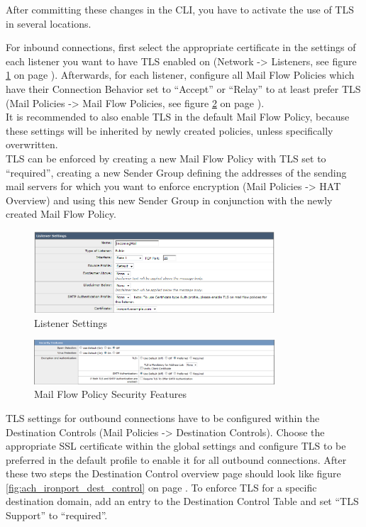 After committing these changes in the CLI, you have to activate the use of TLS in several locations.

For inbound connections, first select the appropriate certificate in the settings of each listener you want to have TLS enabled on (Network -> Listeners, see figure \ref{fig:ach_ironport_listener_cert} on page \pageref{fig:ach_ironport_listener_cert}). Afterwards, for each listener, configure all Mail Flow Policies which have their Connection Behavior set to ``Accept'' or ``Relay'' to at least prefer TLS (Mail Policies -> Mail Flow Policies, see figure \ref{fig:ach_ironport_mail_flow_tls} on page \pageref{fig:ach_ironport_mail_flow_tls}). \\
It is recommended to also enable TLS in the default Mail Flow Policy, because these settings will be inherited by newly created policies, unless specifically overwritten. \\
TLS can be enforced by creating a new Mail Flow Policy with TLS set to ``required'', creating a new Sender Group defining the addresses of the sending mail servers for which you want to enforce encryption (Mail Policies -> HAT Overview) and using this new Sender Group in conjunction with the newly created Mail Flow Policy.

\begin{figure}[p]
  \centering
  \includegraphics[width=0.8\textwidth]{img/ach_ironport_listener_cert.png}
  \caption{Listener Settings}
  \label{fig:ach_ironport_listener_cert}
\end{figure}

\begin{figure}[p]
  \centering
  \includegraphics[width=0.8\textwidth]{img/ach_ironport_mail_flow_tls.png}
  \caption{Mail Flow Policy Security Features}
  \label{fig:ach_ironport_mail_flow_tls}
\end{figure}

TLS settings for outbound connections have to be configured within the Destination Controls (Mail Policies -> Destination Controls). Choose the appropriate SSL certificate within the global settings and configure TLS to be preferred in the default profile to enable it for all outbound connections. After these two steps the Destination Control overview page should look like figure \ref{fig:ach_ironport_dest_control} on page \pageref{fig:ach_ironport_dest_control}.
To enforce TLS for a specific destination domain, add an entry to the Destination Control Table and set ``TLS Support'' to ``required''.

